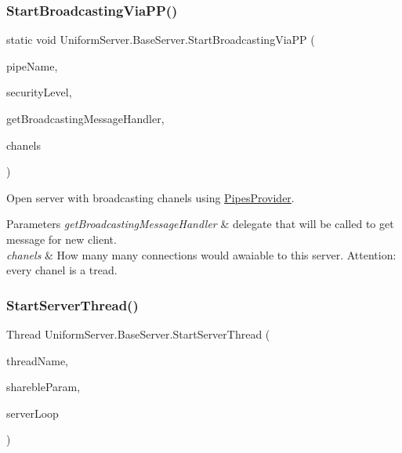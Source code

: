 \subsubsection{\texorpdfstring{Start\+Broadcasting\+Via\+P\+P()}{StartBroadcastingViaPP()}}
{\footnotesize\ttfamily static void Uniform\+Server.\+Base\+Server.\+Start\+Broadcasting\+Via\+PP (\begin{DoxyParamCaption}\item[{string}]{pipe\+Name,  }\item[{\mbox{\hyperlink{namespace_pipes_provider_1_1_security_a1a6020eca1c661a6f7140e8260502d7e}{Pipes\+Provider.\+Security.\+Security\+Level}}}]{security\+Level,  }\item[{Broadcasting\+Server\+Transmission\+Controller.\+Message\+Handeler}]{get\+Broadcasting\+Message\+Handler,  }\item[{int}]{chanels }\end{DoxyParamCaption})\hspace{0.3cm}{\ttfamily [static]}}



Open server with broadcasting chanels using \mbox{\hyperlink{namespace_pipes_provider}{Pipes\+Provider}}. 


\begin{DoxyParams}{Parameters}
{\em get\+Broadcasting\+Message\+Handler} & delegate that will be called to get message for new client.\\
\hline
{\em chanels} & How many many connections would awaiable to this server. Attention\+: every chanel is a tread.\\
\hline
\end{DoxyParams}
\mbox{\label{class_uniform_server_1_1_base_server_aa4a1412b217944e7f8d6ccae6ac68289}} 
\subsubsection{\texorpdfstring{Start\+Server\+Thread()}{StartServerThread()}}
{\footnotesize\ttfamily Thread Uniform\+Server.\+Base\+Server.\+Start\+Server\+Thread (\begin{DoxyParamCaption}\item[{string}]{thread\+Name,  }\item[{object}]{shareble\+Param,  }\item[{Parameterized\+Thread\+Start}]{server\+Loop }\end{DoxyParamCaption})\hspace{0.3cm}{\ttfamily [protected]}}




